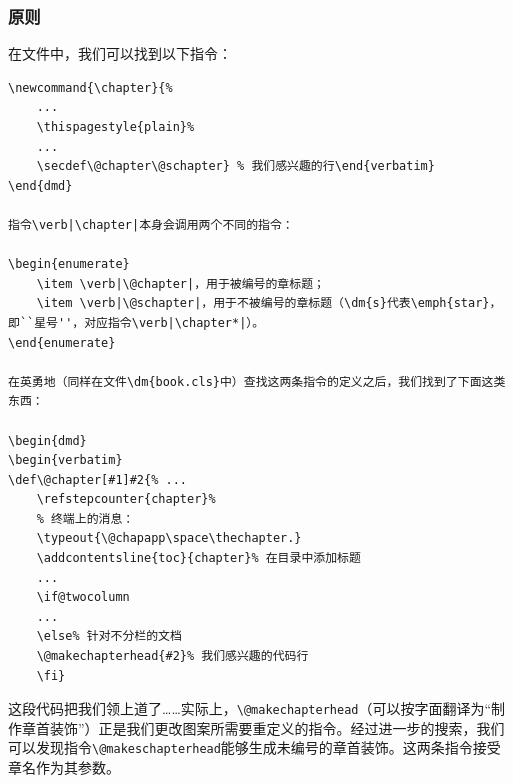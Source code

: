 \subsubsection{原则}

在文件中，我们可以找到以下指令：

\begin{dmd}
\begin{verbatim}
\newcommand{\chapter}{% 
    ...
    \thispagestyle{plain}%
    ...
    \secdef\@chapter\@schapter} % 我们感兴趣的行\end{verbatim}
\end{dmd}

指令\verb|\chapter|本身会调用两个不同的指令：

\begin{enumerate}
    \item \verb|\@chapter|，用于被编号的章标题；
    \item \verb|\@schapter|，用于不被编号的章标题（\dm{s}代表\emph{star}，即``星号''，对应指令\verb|\chapter*|）。
\end{enumerate}

在英勇地（同样在文件\dm{book.cls}中）查找这两条指令的定义之后，我们找到了下面这类东西：

\begin{dmd}
\begin{verbatim}
\def\@chapter[#1]#2{% ...
    \refstepcounter{chapter}%
    % 终端上的消息：
    \typeout{\@chapapp\space\thechapter.} 
    \addcontentsline{toc}{chapter}% 在目录中添加标题
    ...
    \if@twocolumn
    ...
    \else% 针对不分栏的文档
    \@makechapterhead{#2}% 我们感兴趣的代码行
    \fi}\end{verbatim}
\end{dmd}

这段代码把我们领上道了……实际上，\verb+\@makechapterhead+（可以按字面翻译为``制作章首装饰''）正是我们更改图案所需要重定义的指令。经过进一步的搜索，我们可以发现指令\verb|\@makeschapterhead|能够生成未编号的章首装饰。这两条指令接受章名作为其参数。

